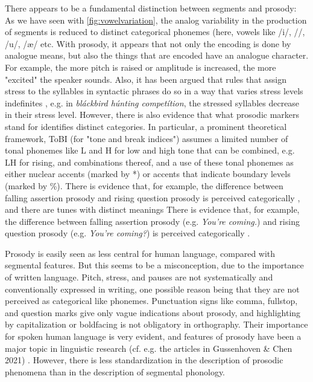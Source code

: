 There appears to be a fundamental distinction between segments and prosody: As we have seen with \ref{fig:vowelvariation}, the analog variability in the production of segments is reduced to distinct categorical phonemes (here, vowels like /i/, //, /u/, /æ/ etc. With prosody, it appears that not only the encoding is done by analogue means, but also the things that are encoded have an analogue character. For example, the more pitch is raised or amplitude is increased, the more "excited" the speaker sounds. Also, it has been argued that rules that assign stress to the syllables in syntactic phrases do so in a way that varies stress levels indefinites \cite{ChomskyHalle}, e.g. in \textit{bláckbird húnting competítion}, the stressed syllables decrease in their stress level. However, there is also evidence that what prosodic markers stand for identifies distinct categories. In particular, a prominent theoretical framework, ToBI (for "tone and break indices") \cite{beckman2006tobi} assumes a limited number of tonal phonemes like L and H for low and high tone that can be combined, e.g. LH for rising, and combinations thereof, and a use of these tonal phonemes as either nuclear accents (marked by *) or accents that indicate boundary levels (marked by \%). There is evidence that, for example, the difference between falling assertion prosody and rising question prosody is perceived categorically \cite{liu2012categorical}, and there are tunes with distinct meanings \cite{Westera2020} There is evidence that, for example, the difference between falling assertion prosody (e.g. \textit{You're coming.}) and rising question prosody (e.g. \textit{You're coming?}) is perceived categorically \cite{liu2012categorical}.

Prosody is easily seen as less central for human language, compared with segmental features. But this seems to be a misconception, due to the importance of written language. Pitch, stress, and pauses are not systematically and conventionally expressed in writing, one possible reason being that they are not perceived as categorical like phonemes. Punctuation signs like comma, fullstop, and question marks give only vague indications about prosody, and highlighting by capitalization or boldfacing is not obligatory in orthography. Their importance for spoken human language is very evident, and features of prosody have been a major topic in linguistic research (cf. e.g. the articles in Gussenhoven & Chen 2021) \cite{gussenhoven2021oxford}. However, there is less standardization in the description of prosodic phenomena than in the description of segmental phonology.

